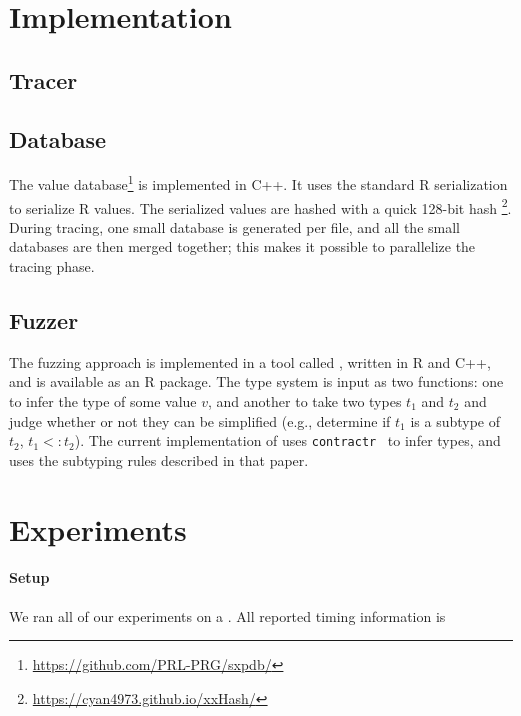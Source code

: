 \documentclass[sigplan,anonymous,review]{acmart}
\begin{document}


\section{Implementation}
\label{sec:implementation}

\subsection{Tracer}
\subsection{Database}
The value database\footnote{\url{https://github.com/PRL-PRG/sxpdb/}  } is implemented in C++. 
It uses the standard R serialization to serialize R values. 
The serialized values are hashed with a quick 128-bit hash \footnote{\url{https://cyan4973.github.io/xxHash/}}. 
During tracing, one small database is generated per file, and all the small databases are then merged together; this makes it possible to parallelize the tracing phase.

\subsection{Fuzzer}
The fuzzing approach is implemented in a tool called \tool, written in R and C++, and is available as an R package.
The type system is input as two functions: one to infer the type of some value $v$, and another to take two types $t_1$ and $t_2$ and judge whether or not they can be simplified (e.g., determine if $t_1$ is a subtype of $t_2$, $t_1 <: t_2$). 
The current implementation of \tool uses {\tt contractr}~\cite{turcotte2020designing} to infer types, and uses the subtyping rules described in that paper.
 

\section{Experiments}
\label{sec:experiments}

\paragraph{Setup} 
We ran all of our experiments on a .
All reported timing information is 
\end{document}
